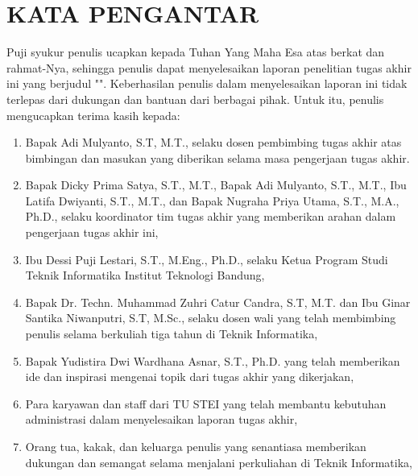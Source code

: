 \chapter*{\MakeUppercase{Kata Pengantar}}

Puji syukur penulis ucapkan kepada Tuhan Yang Maha Esa atas berkat dan rahmat-Nya, sehingga penulis dapat menyelesaikan laporan penelitian tugas akhir ini yang berjudul "{\thetitle}". Keberhasilan penulis dalam menyelesaikan laporan ini tidak terlepas dari dukungan dan bantuan dari berbagai pihak. Untuk itu, penulis mengucapkan terima kasih kepada:

\begin{enumerate}
  \item Bapak Adi Mulyanto, S.T, M.T., selaku dosen pembimbing tugas akhir atas bimbingan dan masukan yang diberikan selama masa pengerjaan tugas akhir.
   
   
  \item Bapak Dicky Prima Satya, S.T., M.T., Bapak Adi Mulyanto, S.T., M.T., Ibu Latifa Dwiyanti, S.T., M.T., dan Bapak Nugraha Priya Utama, S.T., M.A., Ph.D., selaku koordinator tim tugas akhir yang memberikan arahan dalam pengerjaan tugas akhir ini,

  \item Ibu Dessi Puji Lestari, S.T., M.Eng., Ph.D., selaku Ketua Program Studi Teknik Informatika Institut Teknologi Bandung,
   
  \item Bapak Dr. Techn. Muhammad Zuhri Catur Candra, S.T, M.T. dan Ibu Ginar Santika Niwanputri, S.T, M.Sc., selaku dosen wali yang telah membimbing penulis selama berkuliah tiga tahun di Teknik Informatika,
  
  \item Bapak Yudistira Dwi Wardhana Asnar, S.T., Ph.D. yang telah memberikan ide dan inspirasi mengenai topik dari tugas akhir yang dikerjakan, 
  
  \item Para karyawan dan staff dari TU STEI yang telah membantu kebutuhan administrasi dalam menyelesaikan laporan tugas akhir,
  
  \item Orang tua, kakak, dan keluarga penulis yang senantiasa memberikan dukungan dan semangat selama menjalani perkuliahan di Teknik Informatika,


\end{enumerate}
